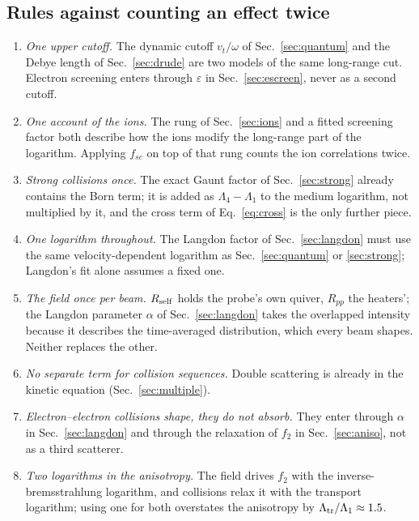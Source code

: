 \documentclass[11pt]{article}
\numberwithin{equation}{section}
\begin{document}
\subsection{Rules against counting an effect twice}
\label{sec:rules}
\begin{enumerate}
\item \emph{One upper cutoff.} The dynamic cutoff $v_t/\omega$ of Sec.~\ref{sec:quantum} and the Debye length of Sec.~\ref{sec:drude} are
two models of the same long-range cut. Electron screening enters through $\varepsilon$ in Sec.~\ref{sec:escreen}, never
as a second cutoff.
\item \emph{One account of the ions.} The rung of Sec.~\ref{sec:ions} and a fitted screening factor both describe how the ions
modify the long-range part of the logarithm. Applying $f_{sc}$ on top of that rung counts the ion
correlations twice.
\item \emph{Strong collisions once.} The exact Gaunt factor of Sec.~\ref{sec:strong} already contains the Born term;
it is added as $\Lambda_4-\Lambda_1$ to the medium logarithm, not multiplied by it, and the
cross term of Eq.~\eqref{eq:cross} is the only further piece.
\item \emph{One logarithm throughout.} The Langdon factor of Sec.~\ref{sec:langdon} must use the same velocity-dependent
logarithm as Sec.~\ref{sec:quantum} or \ref{sec:strong}; Langdon's fit alone assumes a fixed one.
\item \emph{The field once per beam.} $R_{\rm self}$ holds the probe's own quiver, $R_{pp}$ the
heaters'; the Langdon parameter $\alpha$ of Sec.~\ref{sec:langdon} takes the overlapped intensity because it describes
the time-averaged distribution, which every beam shapes. Neither replaces the other.
\item \emph{No separate term for collision sequences.} Double scattering is already in the
kinetic equation (Sec.~\ref{sec:multiple}).
\item \emph{Electron--electron collisions shape, they do not absorb.} They enter through $\alpha$ in
Sec.~\ref{sec:langdon} and through the relaxation of $f_2$ in Sec.~\ref{sec:aniso}, not as a third scatterer.
\item \emph{Two logarithms in the anisotropy.} The field drives $f_2$ with the inverse-bremsstrahlung
logarithm, and collisions relax it with the transport logarithm; using one for both overstates the
anisotropy by $\Lambda_{\rm tr}/\Lambda_1\approx1.5$.
\end{enumerate}
\end{document}

